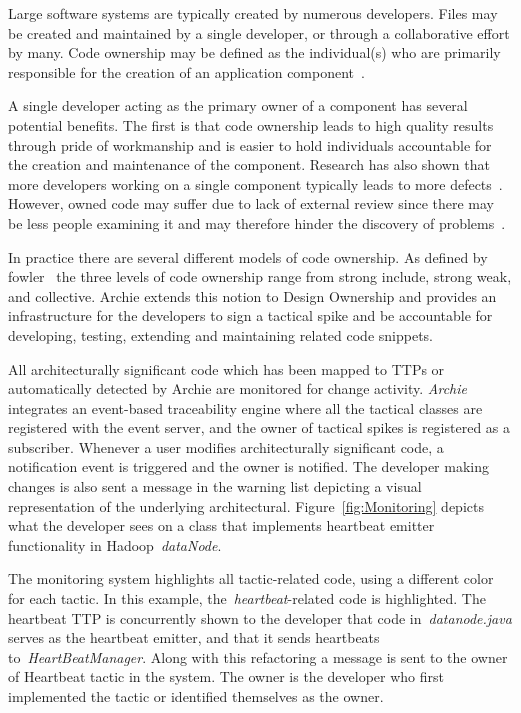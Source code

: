 Large software systems are typically created by numerous developers. Files may be created and maintained by a single developer, or through a collaborative effort by many. Code ownership may be defined as the individual(s) who are primarily responsible for the creation of an application component~\cite{Rahman:2011:OED:1985793.1985860}.

A single developer acting as the primary owner of a component has several potential benefits. The first is that code ownership leads to high quality results through pride of workmanship and is easier to hold individuals accountable for the creation and maintenance of the component. Research has also shown that more developers working on a single component typically leads to more defects~\cite{Raymond:2001:CBM:560911}. However, owned code may suffer due to lack of external review since there may be less people examining it and may therefore hinder the discovery of problems~\cite{Rahman:2011:OED:1985793.1985860}. 

In practice there are several different models of code ownership. As defined by fowler~\cite{fowler_codeownership} the three levels of code ownership range from strong include, strong weak, and collective. Archie extends this notion to Design Ownership and provides an infrastructure for the developers to sign a tactical spike and be accountable for developing, testing, extending and maintaining related code snippets.

All architecturally significant code which has been mapped to TTPs or automatically detected by Archie are monitored for change activity. \emph{Archie} integrates an event-based traceability engine where all the tactical classes are registered with the event server, and the owner of tactical spikes is registered as a subscriber. Whenever a user modifies architecturally significant code, a notification event is triggered and the owner is notified. The developer making changes is also sent a message in the warning list depicting a visual representation of the underlying architectural. Figure~\ref{fig:Monitoring} depicts what the developer sees on a class that implements heartbeat emitter functionality in Hadoop~\emph{dataNode}. 

 The monitoring system highlights all tactic-related code, using a different color for each tactic. In this example, the~\emph{heartbeat}-related code is highlighted. The heartbeat TTP is concurrently shown to the developer that code in~\emph{datanode.java} serves as the heartbeat emitter, and that it sends heartbeats to~\emph{HeartBeatManager}. Along with this refactoring a message is sent to the owner of Heartbeat tactic in the system. The owner is the developer who first implemented the tactic or identified themselves as the owner.

